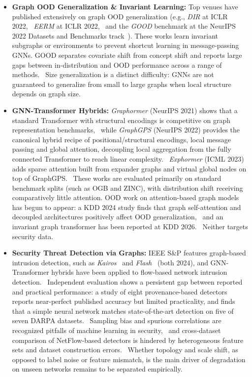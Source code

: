 \documentclass[a4paper,10pt]{article}
\begin{document}
\begin{itemize}
    \item \textbf{Graph OOD Generalization \& Invariant Learning:} Top venues have published extensively on graph OOD generalization (e.g., \emph{DIR} at ICLR 2022,~\cite{wu2022dir} \emph{EERM} at ICLR 2022,~\cite{wu2022eerm} and the \emph{GOOD} benchmark at the NeurIPS 2022 Datasets and Benchmarks track~\cite{gui2022good}). These works learn invariant subgraphs or environments to prevent shortcut learning in message-passing GNNs. GOOD separates covariate shift from concept shift and reports large gaps between in-distribution and OOD performance across a range of methods.~\cite{gui2022good} Size generalization is a distinct difficulty: GNNs are not guaranteed to generalize from small to large graphs when local structure depends on graph size.~\cite{yehudai2021size}
    \item \textbf{GNN-Transformer Hybrids:} \emph{Graphormer} (NeurIPS 2021) shows that a standard Transformer with structural encodings is competitive on graph representation benchmarks,~\cite{ying2021graphormer} while \emph{GraphGPS} (NeurIPS 2022) provides the canonical hybrid recipe of positional/structural encodings, local message passing and global attention, decoupling local aggregation from the fully connected Transformer to reach linear complexity.~\cite{rampasek2022graphgps} \emph{Exphormer} (ICML 2023) adds sparse attention built from expander graphs and virtual global nodes on top of GraphGPS.~\cite{shirzad2023exphormer} These works are evaluated primarily on standard benchmark splits (such as OGB and ZINC), with distribution shift receiving comparatively little attention. OOD work on attention-based graph models has begun to appear: a KDD 2024 study finds that graph self-attention and decoupled architectures positively affect OOD generalization,~\cite{guo2024ood} and an invariant graph transformer has been reported at KDD 2026.~\cite{liao2026igt} Neither targets security data.
    \item \textbf{Security Threat Detection via Graphs:} IEEE S\&P features graph-based intrusion detection, such as \emph{Kairos}~\cite{cheng2024kairos} and \emph{Flash}~\cite{rehman2024flash} (both 2024), and GNN-Transformer hybrids have been applied to flow-based network intrusion detection.~\cite{xie2026hybrid,appiahene2026hybrid,zhang2024icist} Independent evaluation shows a persistent gap between reported and practical performance: a study of eight provenance-based detectors reports near-perfect published accuracy but limited practicality, and finds that a simple neural network matches state-of-the-art detection on five of seven DARPA datasets.~\cite{bilot2025simpler} Sampling bias and spurious correlations are recognized pitfalls of machine learning in security,~\cite{arp2022dos} and cross-dataset comparison of NetFlow-based detectors is hindered by heterogeneous feature sets and dataset construction errors.~\cite{sarhan2021netflow,engelen2021cicids} Whether topology and scale shift, as opposed to label noise or feature mismatch, is the main driver of degradation on unseen networks remains to be separated empirically.
\end{itemize}
\end{document}
